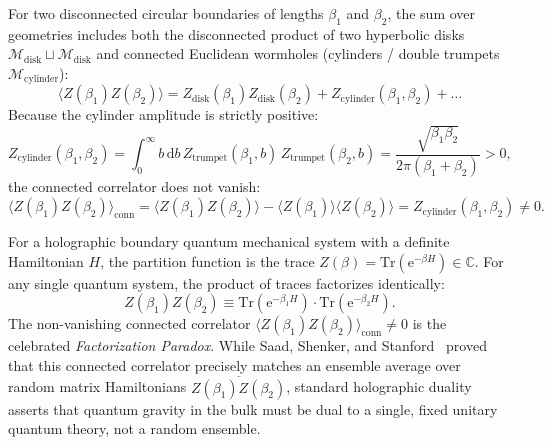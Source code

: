 \documentclass[11pt,a4paper,reqno]{article}
\theoremstyle{plain}
\theoremstyle{definition}
\theoremstyle{remark}
\numberwithin{equation}{section}
\newcommand{\diff}{\mathrm{d}}
\newcommand{\Tr}{\mathrm{Tr}}
\begin{document}
For two disconnected circular boundaries of lengths $\beta_1$ and $\beta_2$, the sum over geometries includes both the disconnected product of two hyperbolic disks $\mathcal{M}_{\mathrm{disk}} \sqcup \mathcal{M}_{\mathrm{disk}}$ and connected Euclidean wormholes (cylinders / double trumpets $\mathcal{M}_{\mathrm{cylinder}}$):
\begin{equation}
  \langle Z(\beta_1) Z(\beta_2) \rangle = Z_{\mathrm{disk}}(\beta_1) Z_{\mathrm{disk}}(\beta_2) + Z_{\mathrm{cylinder}}(\beta_1, \beta_2) + \dots
  \label{eq:wormhole_connected_correlator}
\end{equation}
Because the cylinder amplitude is strictly positive:
\begin{equation}
  Z_{\mathrm{cylinder}}(\beta_1, \beta_2) = \int_0^\infty b \, \diff b \, Z_{\mathrm{trumpet}}(\beta_1, b) \, Z_{\mathrm{trumpet}}(\beta_2, b) = \frac{\sqrt{\beta_1 \beta_2}}{2\pi(\beta_1 + \beta_2)} > 0,
  \label{eq:double_trumpet_integral}
\end{equation}
the connected correlator does not vanish:
\begin{equation}
  \langle Z(\beta_1) Z(\beta_2) \rangle_{\mathrm{conn}} = \langle Z(\beta_1) Z(\beta_2) \rangle - \langle Z(\beta_1) \rangle \langle Z(\beta_2) \rangle = Z_{\mathrm{cylinder}}(\beta_1, \beta_2) \neq 0.
\end{equation}

For a holographic boundary quantum mechanical system with a definite Hamiltonian $H$, the partition function is the trace $Z(\beta) = \Tr(\mathrm{e}^{-\beta H}) \in \mathbb{C}$. For any single quantum system, the product of traces factorizes identically:
\begin{equation}
  Z(\beta_1) Z(\beta_2) \equiv \Tr(\mathrm{e}^{-\beta_1 H}) \cdot \Tr(\mathrm{e}^{-\beta_2 H}).
\end{equation}
The non-vanishing connected correlator $\langle Z(\beta_1) Z(\beta_2) \rangle_{\mathrm{conn}} \neq 0$ is the celebrated \emph{Factorization Paradox}. While Saad, Shenker, and Stanford~\cite{SaadShenkerStanford2019} proved that this connected correlator precisely matches an ensemble average over random matrix Hamiltonians $\overline{Z(\beta_1) Z(\beta_2)}$, standard holographic duality asserts that quantum gravity in the bulk must be dual to a single, fixed unitary quantum theory, not a random ensemble.

\end{document}
